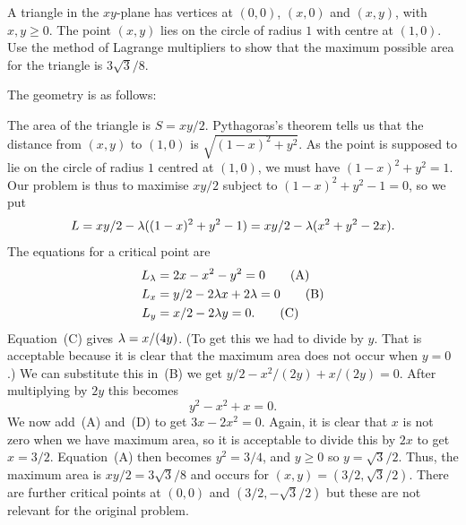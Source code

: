 \documentclass[a4paper]{amsart}
\renewenvironment{solution}{\SolutionInline}{\endSolutionInline}
\begin{document}
\begin{exercise}
 A triangle in the $xy$-plane has vertices at $(0,0)$, $(x,0)$ and
 $(x,y)$, with $x,y\geq 0$.  The point $(x,y)$ lies on the circle of
 radius $1$ with centre at $(1,0)$. Use the method of Lagrange
 multipliers to show that the maximum possible area for the triangle
 is $3\sqrt{3}/8$.
\end{exercise}
\begin{solution}
 The geometry is as follows:
 \begin{center}
 \end{center}
 The area of the triangle is $S=xy/2$.  Pythagoras's theorem tells us
 that the distance from $(x,y)$ to $(1,0)$ is $\sqrt{(1-x)^2+y^2}$.
 As the point is supposed to lie on the circle of radius $1$ centred
 at $(1,0)$, we must have $(1-x)^2+y^2=1$.  Our problem is thus to
 maximise $xy/2$ subject to $(1-x)^2+y^2-1=0$, so we put 
 \[ L = xy/2 - \lambda ((1-x)^2+y^2-1) = xy/2-\lambda(x^2+y^2-2x). \]
 The equations for a critical point are
 \begin{align*}
  L_\lambda &= 2x-x^2-y^2 = 0 \tag{A} \\
  L_x &= y/2-2\lambda x+2\lambda = 0 \tag{B} \\
  L_y &= x/2-2\lambda y = 0. \tag{C}
 \end{align*}
 Equation~(C) gives $\lambda=x/(4y)$.  (To get this we had to divide by
 $y$.  That is acceptable because it is clear that the maximum area
 does not occur when $y=0$.)  We can substitute this in~(B) we
 get $y/2-x^2/(2y)+x/(2y)=0$.  After multiplying by $2y$ this becomes
 \[ y^2-x^2+x=0. \tag{D} \]
 We now add~(A) and~(D) to get $3x-2x^2=0$.  Again, it is clear that
 $x$ is not zero when we have maximum area, so it is acceptable to
 divide this by $2x$ to get $x=3/2$.  Equation~(A) then becomes
 $y^2=3/4$, and $y\geq 0$ so $y=\sqrt{3}/2$.  Thus, the maximum area
 is $xy/2=3\sqrt{3}/8$ and occurs for $(x,y)=(3/2,\sqrt{3}/2)$.
 There are further critical points at $(0,0)$ and $(3/2,-\sqrt{3}/2)$
 but these are not relevant for the original problem.  


\end{solution}
\end{document}

